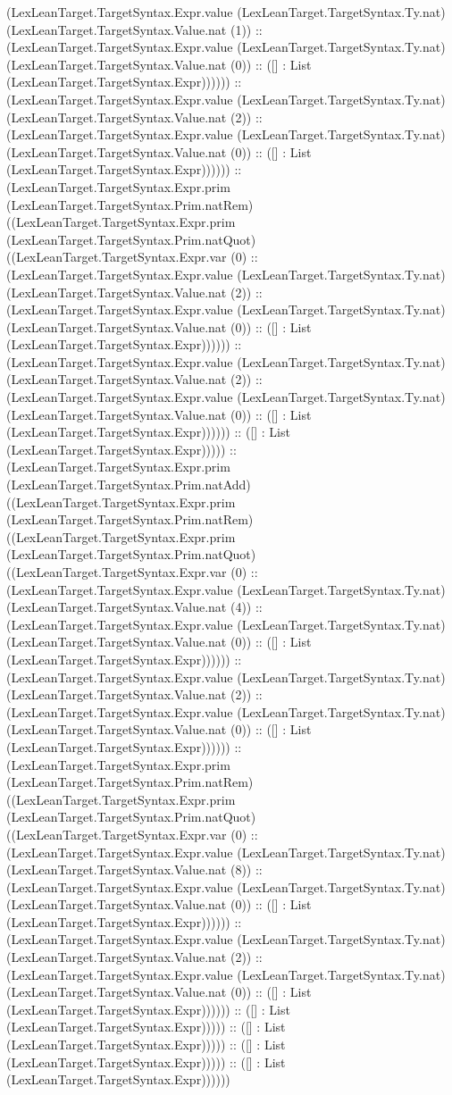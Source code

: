 \documentclass[11pt]{article}
\begin{document}
(LexLeanTarget.TargetSyntax.Expr.value (LexLeanTarget.TargetSyntax.Ty.nat) (LexLeanTarget.TargetSyntax.Value.nat (1)) :: (LexLeanTarget.TargetSyntax.Expr.value (LexLeanTarget.TargetSyntax.Ty.nat) (LexLeanTarget.TargetSyntax.Value.nat (0)) :: ([] : List (LexLeanTarget.TargetSyntax.Expr)))))) :: (LexLeanTarget.TargetSyntax.Expr.value (LexLeanTarget.TargetSyntax.Ty.nat) (LexLeanTarget.TargetSyntax.Value.nat (2)) :: (LexLeanTarget.TargetSyntax.Expr.value (LexLeanTarget.TargetSyntax.Ty.nat) (LexLeanTarget.TargetSyntax.Value.nat (0)) :: ([] : List (LexLeanTarget.TargetSyntax.Expr)))))) :: (LexLeanTarget.TargetSyntax.Expr.prim (LexLeanTarget.TargetSyntax.Prim.natRem) ((LexLeanTarget.TargetSyntax.Expr.prim (LexLeanTarget.TargetSyntax.Prim.natQuot) ((LexLeanTarget.TargetSyntax.Expr.var (0) :: (LexLeanTarget.TargetSyntax.Expr.value (LexLeanTarget.TargetSyntax.Ty.nat) (LexLeanTarget.TargetSyntax.Value.nat (2)) :: (LexLeanTarget.TargetSyntax.Expr.value (LexLeanTarget.TargetSyntax.Ty.nat) (LexLeanTarget.TargetSyntax.Value.nat (0)) :: ([] : List (LexLeanTarget.TargetSyntax.Expr)))))) :: (LexLeanTarget.TargetSyntax.Expr.value (LexLeanTarget.TargetSyntax.Ty.nat) (LexLeanTarget.TargetSyntax.Value.nat (2)) :: (LexLeanTarget.TargetSyntax.Expr.value (LexLeanTarget.TargetSyntax.Ty.nat) (LexLeanTarget.TargetSyntax.Value.nat (0)) :: ([] : List (LexLeanTarget.TargetSyntax.Expr)))))) :: ([] : List (LexLeanTarget.TargetSyntax.Expr))))) :: (LexLeanTarget.TargetSyntax.Expr.prim (LexLeanTarget.TargetSyntax.Prim.natAdd) ((LexLeanTarget.TargetSyntax.Expr.prim (LexLeanTarget.TargetSyntax.Prim.natRem) ((LexLeanTarget.TargetSyntax.Expr.prim (LexLeanTarget.TargetSyntax.Prim.natQuot) ((LexLeanTarget.TargetSyntax.Expr.var (0) :: (LexLeanTarget.TargetSyntax.Expr.value (LexLeanTarget.TargetSyntax.Ty.nat) (LexLeanTarget.TargetSyntax.Value.nat (4)) :: (LexLeanTarget.TargetSyntax.Expr.value (LexLeanTarget.TargetSyntax.Ty.nat) (LexLeanTarget.TargetSyntax.Value.nat (0)) :: ([] : List (LexLeanTarget.TargetSyntax.Expr)))))) :: (LexLeanTarget.TargetSyntax.Expr.value (LexLeanTarget.TargetSyntax.Ty.nat) (LexLeanTarget.TargetSyntax.Value.nat (2)) :: (LexLeanTarget.TargetSyntax.Expr.value (LexLeanTarget.TargetSyntax.Ty.nat) (LexLeanTarget.TargetSyntax.Value.nat (0)) :: ([] : List (LexLeanTarget.TargetSyntax.Expr)))))) :: (LexLeanTarget.TargetSyntax.Expr.prim (LexLeanTarget.TargetSyntax.Prim.natRem) ((LexLeanTarget.TargetSyntax.Expr.prim (LexLeanTarget.TargetSyntax.Prim.natQuot) ((LexLeanTarget.TargetSyntax.Expr.var (0) :: (LexLeanTarget.TargetSyntax.Expr.value (LexLeanTarget.TargetSyntax.Ty.nat) (LexLeanTarget.TargetSyntax.Value.nat (8)) :: (LexLeanTarget.TargetSyntax.Expr.value (LexLeanTarget.TargetSyntax.Ty.nat) (LexLeanTarget.TargetSyntax.Value.nat (0)) :: ([] : List (LexLeanTarget.TargetSyntax.Expr)))))) :: (LexLeanTarget.TargetSyntax.Expr.value (LexLeanTarget.TargetSyntax.Ty.nat) (LexLeanTarget.TargetSyntax.Value.nat (2)) :: (LexLeanTarget.TargetSyntax.Expr.value (LexLeanTarget.TargetSyntax.Ty.nat) (LexLeanTarget.TargetSyntax.Value.nat (0)) :: ([] : List (LexLeanTarget.TargetSyntax.Expr)))))) :: ([] : List (LexLeanTarget.TargetSyntax.Expr))))) :: ([] : List (LexLeanTarget.TargetSyntax.Expr))))) :: ([] : List (LexLeanTarget.TargetSyntax.Expr))))) :: ([] : List (LexLeanTarget.TargetSyntax.Expr)))))) 
\end{document}
